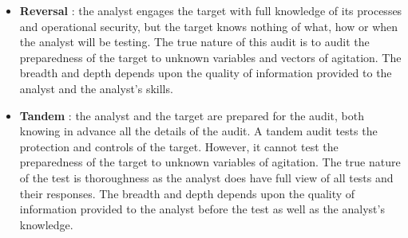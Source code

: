 \documentclass[11pt]{article}
\begin{document}
\begin{itemize}
\item \textbf{Reversal} : the analyst engages the target with full knowledge of its processes and operational security, but the target knows nothing of what, how or when the analyst will be testing. The true nature of this audit is to audit the preparedness of the target to unknown variables and vectors of agitation. The breadth and depth depends upon the quality of information provided to the analyst and the analyst's skills.
\item \textbf{Tandem} : the analyst and the target are prepared for the audit, both knowing in advance all the details of the audit. A tandem audit tests the protection and controls of the target. However, it cannot test the preparedness of the target to unknown variables of agitation. The true nature of the test is thoroughness as the analyst does have full view of all tests and their responses. The breadth and depth depends upon the quality of information provided to the analyst before the test as well as the analyst's knowledge.
\end{itemize}
\end{document}
